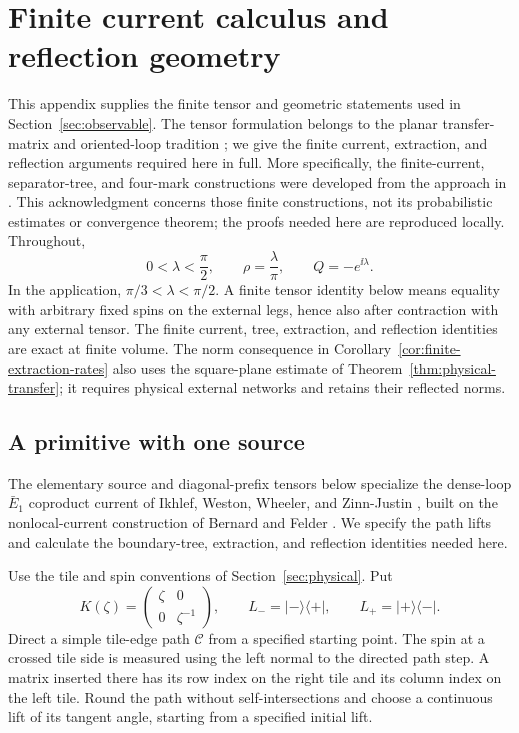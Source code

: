\section{Finite current calculus and reflection geometry}
\label{sec:finite-calculus}

This appendix supplies the finite tensor and geometric statements used in
Section~\ref{sec:observable}.  The tensor formulation belongs to the
planar transfer-matrix and oriented-loop tradition
\cite{TemperleyLieb1971,BaxterKellandWu1976}; we give the finite current,
extraction, and reflection arguments required here in full.
More specifically, the finite-current, separator-tree, and four-mark
constructions were developed from the approach in
\cite{OpenAIConformalLimits2026}. This acknowledgment concerns those finite
constructions, not its probabilistic estimates or convergence theorem;
the proofs needed here are reproduced locally. Throughout,
\[
 0<\lambda<\frac{\pi}{2},\qquad
 \rho=\frac{\lambda}{\pi},\qquad Q=-e^{\ii\lambda}.
\]
In the application, $\pi/3<\lambda<\pi/2$.  A finite tensor identity below
means equality with arbitrary fixed spins on the external legs, hence also
after contraction with any external tensor.  The finite current, tree,
extraction, and reflection identities are exact at finite volume. The
norm consequence in Corollary~\ref{cor:finite-extraction-rates} also
uses the square-plane estimate of Theorem~\ref{thm:physical-transfer};
it requires physical external networks and retains their reflected
norms.

\subsection{A primitive with one source}
\label{calc:primitive}

The elementary source and diagonal-prefix tensors below specialize the
dense-loop $\bar E_1$ coproduct current of Ikhlef, Weston, Wheeler, and
Zinn-Justin
\cite[Sections~2.3, 2.5.1, 3.1--3.2, and~4.1]{IkhlefWestonWheelerZinnJustin2013},
built on the nonlocal-current construction of Bernard and Felder
\cite{BernardFelder1991}.  We specify the path lifts and calculate the
boundary-tree, extraction, and reflection identities needed here.

Use the tile and spin conventions of Section~\ref{sec:physical}.  Put
\[
 K(\zeta)=\begin{pmatrix}\zeta&0\\0&\zeta^{-1}\end{pmatrix},
 \qquad L_- = |-\rangle\langle+|,
 \qquad L_+ = |+\rangle\langle-|.
\]
Direct a simple tile-edge path $\mathcal C$ from a specified starting
point.  The spin at a crossed tile side is measured using the left normal
to the directed path step.  A matrix inserted there has its row index on
the right tile and its column index on the left tile.  Round the path
without self-intersections and choose a continuous lift of its tangent
angle, starting from a specified initial lift.

